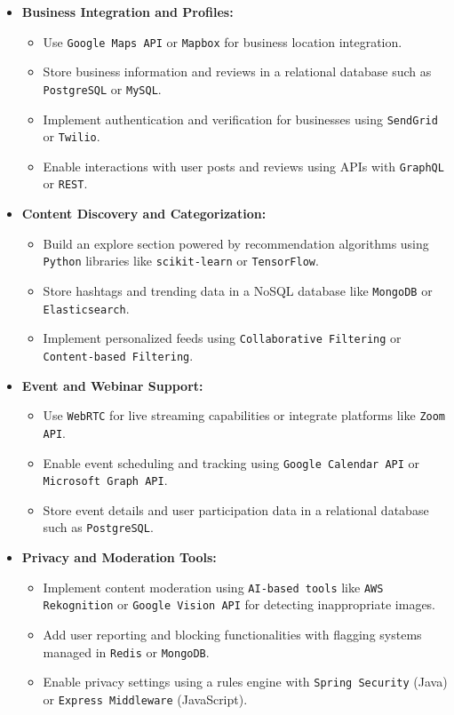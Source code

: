 \begin{itemize}
    \item \textbf{Business Integration and Profiles:}
    \begin{itemize}
        \item Use \texttt{Google Maps API} or \texttt{Mapbox} for business location integration.
        \item Store business information and reviews in a relational database such as \texttt{PostgreSQL} or \texttt{MySQL}.
        \item Implement authentication and verification for businesses using \texttt{SendGrid} or \texttt{Twilio}.
        \item Enable interactions with user posts and reviews using APIs with \texttt{GraphQL} or \texttt{REST}.
    \end{itemize}
    
    \item \textbf{Content Discovery and Categorization:}
    \begin{itemize}
        \item Build an explore section powered by recommendation algorithms using \texttt{Python} libraries like \texttt{scikit-learn} or \texttt{TensorFlow}.
        \item Store hashtags and trending data in a NoSQL database like \texttt{MongoDB} or \texttt{Elasticsearch}.
        \item Implement personalized feeds using \texttt{Collaborative Filtering} or \texttt{Content-based Filtering}.
    \end{itemize}
    
    \item \textbf{Event and Webinar Support:}
    \begin{itemize}
        \item Use \texttt{WebRTC} for live streaming capabilities or integrate platforms like \texttt{Zoom API}.
        \item Enable event scheduling and tracking using \texttt{Google Calendar API} or \texttt{Microsoft Graph API}.
        \item Store event details and user participation data in a relational database such as \texttt{PostgreSQL}.
    \end{itemize}
    
    \item \textbf{Privacy and Moderation Tools:}
    \begin{itemize}
        \item Implement content moderation using \texttt{AI-based tools} like \texttt{AWS Rekognition} or \texttt{Google Vision API} for detecting inappropriate images.
        \item Add user reporting and blocking functionalities with flagging systems managed in \texttt{Redis} or \texttt{MongoDB}.
        \item Enable privacy settings using a rules engine with \texttt{Spring Security} (Java) or \texttt{Express Middleware} (JavaScript).
    \end{itemize}


\end{itemize}
